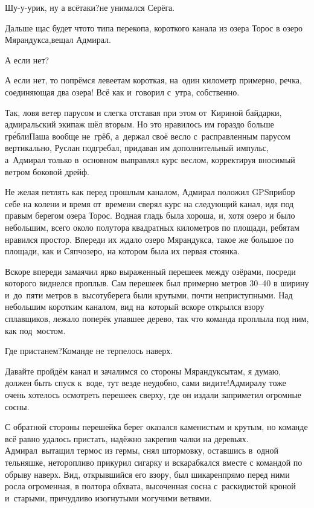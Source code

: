 \diagdash Шу-у-урик, ну а всё\sdash таки?\mdash не унимался Серёга.

\diagdash Дальше щас будет что\sdash то типа перекопа, короткого канала из озера Торос в озеро Мярандукса,\mdash вещал Адмирал.

\diagdash А если нет?

\diagdash А если нет, то попрёмся левее\mdash там короткая, на~один километр примерно, речка, соединяющая два озера! Всё как и~говорил с~утра, собственно.

Так, ловя ветер парусом и слегка отставая при этом от~Кириной байдарки, адмиральский экипаж шёл вторым. Но это нравилось им гораздо больше гр{\'е}бли\mdash Паша вообще не~грёб, а~держал своё весло с~расправленным парусом вертикально, Руслан подгребал, придавая им дополнительный импульс, а~Адмирал только в~основном выправлял курс веслом, корректируя вносимый ветром боковой дрейф.

Не желая петлять как перед прошлым каналом, Адмирал положил GPS\sdash прибор себе на колени и время от~времени сверял курс на следующий канал, идя под правым берегом озера Торос. Водная гладь была хороша, и, хотя озеро и было небольшим, всего около полутора квадратных километров по площади, ребятам нравился простор. Впереди их ждало озеро Мярандукса, такое же большое по площади, как и Сяпчозеро, на котором была их первая стоянка. 

Вскоре впереди замаячил ярко выраженный перешеек между озёрами, посреди которого виднелся проплыв. Сам перешеек был примерно метров 30\nobreakdash--40 в ширину и~до~пяти метров в~высоту\mdash берега были крутыми, почти неприступными. Над небольшим коротким каналом, вид на~который вскоре открылся взору сплавщиков, лежало поперёк упавшее дерево, так что команда проплыла под ним, как под~мостом.

\diagdash Где пристанем?\mdash Команде не терпелось наверх.

\diagdash Давайте пройдём канал и зачалимся со стороны Мярандуксы\mdash там, я думаю, должен быть спуск к~воде, тут везде неудобно, сами видите!\mdash Адмиралу тоже очень хотелось осмотреть перешеек сверху, где он издали заприметил огромные сосны.

С обратной стороны перешейка берег оказался каменистым и крутым, но команде всё равно удалось пристать, надёжно закрепив чалки на деревьях. Адмирал~вытащил термос из гермы, снял штормовку, оставшись в~одной тельняшке, неторопливо прикурил сигарку и вскарабкался вместе с командой по обрыву наверх. Вид, открывшийся его взору, был шикарен\mdash прямо перед ними росла огроменная, в полтора обхвата, высоченная сосна с~раскидистой кроной и~старыми, причудливо изогнутыми могучими ветвями. %

